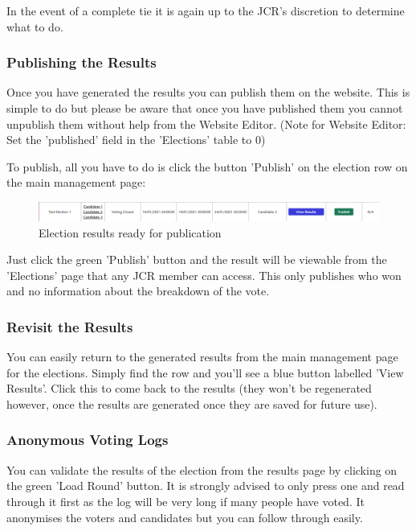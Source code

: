 \documentclass{article}
\begin{document}
In the event of a complete tie it is again up to the JCR's discretion to determine what to do.
\subsubsection{Publishing the Results}
Once you have generated the results you can publish them on the website. This is simple to do but please be aware that once you have published them you cannot unpublish them without help from the Website Editor. (Note for Website Editor: Set the 'published' field in the 'Elections' table to 0)

To publish, all you have to do is click the button 'Publish' on the election row on the main management page:
\begin{figure}[H]
    \centering
    \includegraphics[width=\textwidth,height=\textheight,keepaspectratio]{elections/election_row_publish.png}
    \caption{Election results ready for publication}
    \label{fig:election_publication_ready}
\end{figure}
Just click the green 'Publish' button and the result will be viewable from the 'Elections' page that any JCR member can access. This only publishes who won and no information about the breakdown of the vote. 
\subsubsection{Revisit the Results}
You can easily return to the generated results from the main management page for the elections. Simply find the row and you'll see a blue button labelled 'View Results'. Click this to come back to the results (they won't be regenerated however, once the results are generated once they are saved for future use).
\subsubsection{Anonymous Voting Logs}
You can validate the results of the election from the results page by clicking on the green 'Load Round' button. It is strongly advised to only press one and read through it first as the log will be very long if many people have voted. It anonymises the voters and candidates but you can follow through easily.
\end{document}
